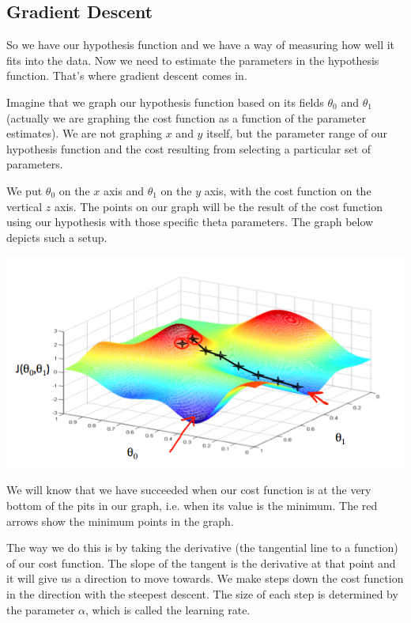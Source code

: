 \documentclass[UTF8]{article}
\begin{document}
\subsection{Gradient Descent}

So we have our hypothesis function and we have a way of measuring how well it fits into the data. Now we need to estimate the parameters in the hypothesis function. That's where gradient descent comes in.

Imagine that we graph our hypothesis function based on its fields $\theta_0$ and $\theta_1$ (actually we are graphing the cost function as a function of the parameter estimates). We are not graphing $x$ and $y$ itself, but the parameter range of our hypothesis function and the cost resulting from selecting a particular set of parameters.

We put $\theta_0$ on the $x$ axis and $\theta_1$ on the $y$ axis, with the cost function on the vertical $z$ axis. The points on our graph will be the result of the cost function using our hypothesis with those specific theta parameters. The graph below depicts such a setup.

\includegraphics[width = \textwidth]{NotePics/2_3_1.png}

We will know that we have succeeded when our cost function is at the very bottom of the pits in our graph, i.e. when its value is the minimum. The red arrows show the minimum points in the graph.

The way we do this is by taking the derivative (the tangential line to a function) of our cost function. The slope of the tangent is the derivative at that point and it will give us a direction to move towards. We make steps down the cost function in the direction with the steepest descent. The size of each step is determined by the parameter $\alpha$, which is called the learning rate.
\end{document}
